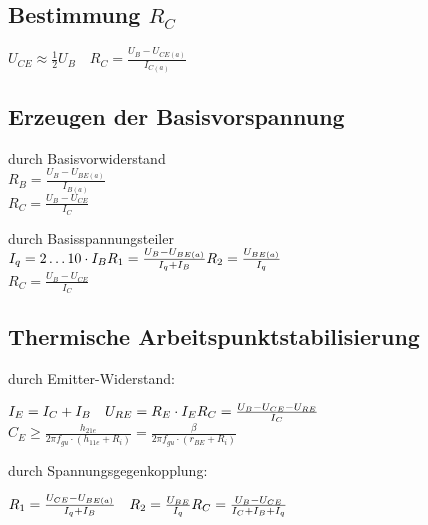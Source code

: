 \subsection{Bestimmung \texorpdfstring{$R_C$}{RC}}
$U_{CE}\approx \frac{1}{2}U_B\quad R_C=\frac{U_B-U_{CE(a)}}{I_{C(a)}}$

\subsection{Erzeugen der Basisvorspannung}
    \begin{minipage}{0.5\columnwidth}
        durch Basisvorwiderstand\\
        $R_B=\frac{U_B-U_{BE(a)}}{I_{B(a)}}$\\ %
        $R_C=\frac{U_B-U_{CE}}{I_C}$
    \end{minipage}
    \begin{minipage}{0.5\columnwidth}
    \end{minipage}

    \begin{minipage}{0.5\columnwidth}
        durch Basisspannungsteiler\\
        $I_q=2\dots 10\cdot I_B\\
        R_1=\frac{U_B-U_{BE(a)}}{I_q+I_B}\\
        R_2=\frac{U_{BE(a)}}{I_q}$\\
        $R_C=\frac{U_B-U_{CE}}{I_C}$
    \end{minipage}
    \begin{minipage}{0.5\columnwidth}
    \end{minipage}

\subsection{Thermische Arbeitspunktstabilisierung}
    \begin{minipage}{0.5\columnwidth}
        durch Emitter-Widerstand:
        
        $I_E=I_C+I_B\quad U_{RE}=R_E\cdot I_E\\
        R_C=\frac{U_B-U_{CE}-U_{RE}}{I_C}$\\ %
        $C_E\geq\frac{h_{21e}}{2\pi f_{gu}\cdot(h_{11e}+R_i)}=\frac{\beta}{2\pi f_{gu}\cdot(r_{BE}+R_i)}$ %
        
    \end{minipage}
    \begin{minipage}{0.5\columnwidth}
        durch Spannungsgegenkopplung:
        
        $R_1=\frac{U_{CE}-U_{BE(a)}}{I_q+I_B}\quad R_2=\frac{U_{BE}}{I_q}\\
        R_C=\frac{U_B-U_{CE}}{I_C+I_B+I_q}$ 
        
    \end{minipage}